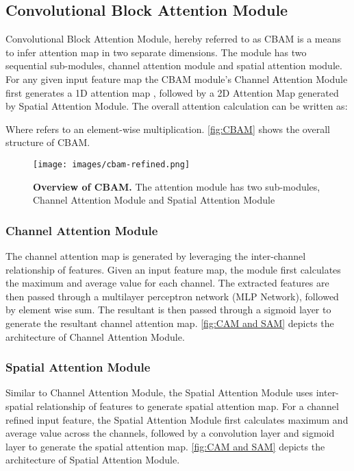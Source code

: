 \documentclass[review]{elsarticle}
\begin{document}
\subsection{Convolutional Block Attention Module}
Convolutional Block Attention Module\cite{Woo2018}, hereby referred to as CBAM is a means to infer attention map in two separate dimensions. The module has two sequential sub-modules, channel attention module and spatial attention module. For any given input feature map  the CBAM module's Channel Attention Module first generates a 1D attention map , followed by a 2D Attention Map  generated by Spatial Attention Module. The overall attention calculation can be written as:


Where  refers to an element-wise multiplication. \autoref{fig:CBAM} shows the overall structure of CBAM.

\begin{figure}[t]
\caption{\textbf{Overview of CBAM.} The attention module has two sub-modules, Channel Attention Module and Spatial Attention Module}
\centering
\texttt{[image: images/cbam-refined.png]}
\label{fig:CBAM}
\end{figure}

\subsubsection{Channel Attention Module}
The channel attention map is generated by leveraging the inter-channel relationship of features. Given an input feature map, the module first calculates the maximum and average value for each channel. The extracted features are then passed through a multilayer perceptron network (MLP Network), followed by element wise sum. The resultant is then passed through a sigmoid layer to generate the resultant channel attention map. \autoref{fig:CAM and SAM} depicts the architecture of Channel Attention Module.

\subsubsection{Spatial Attention Module}
Similar to Channel Attention Module, the Spatial Attention Module uses inter-spatial relationship of features to generate spatial attention map. For a channel refined input feature, the Spatial Attention Module first calculates maximum and average value across the channels, followed by a convolution layer and sigmoid layer to generate the spatial attention map. \autoref{fig:CAM and SAM} depicts the architecture of Spatial Attention Module.
\end{document}
